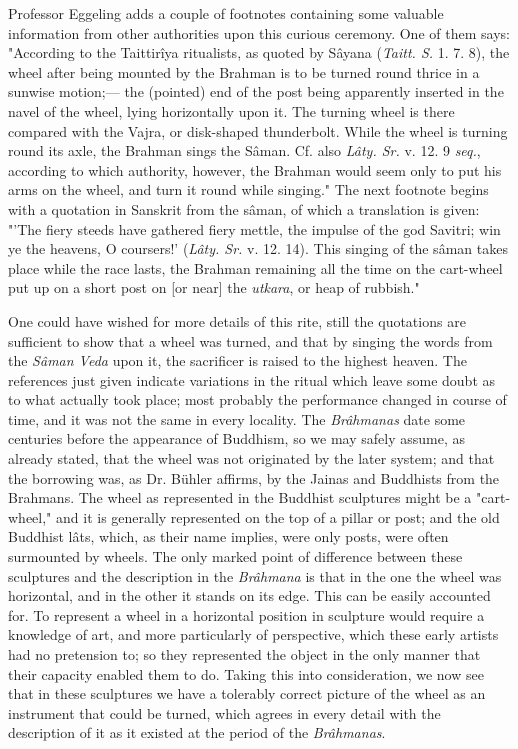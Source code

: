 \documentclass[a4paper, 11pt, oneside, polutonikogreek, english]{article}
\begin{document}
Professor Eggeling adds a couple of footnotes containing some valuable information from other authorities upon this curious ceremony. One of them says: "According to the Taittirîya ritualists, as quoted by Sâyana (\emph{Taitt. S.} 1. 7. 8), the wheel after being mounted by the Brahman is to be turned round thrice in a sunwise motion;--- the (pointed) end of the post being apparently inserted in the navel of the wheel, lying horizontally upon it. The turning wheel is there compared with the Vajra, or disk-shaped thunderbolt. While the wheel is turning round its axle, the Brahman sings the Sâman. Cf. also \emph{Lâty. Sr.} v. 12. 9 \emph{seq.}, according to which authority, however, the Brahman would seem only to put his arms on the wheel, and turn it round while singing." The next footnote begins with a quotation in Sanskrit from the sâman, of which a translation is given: "'The fiery steeds have gathered fiery mettle, the impulse of the god Savitri; win ye the heavens, O coursers!' (\emph{Lâty. Sr.} v. 12. 14). This singing of the sâman takes place while the race lasts, the Brahman remaining all the time on the cart-wheel put up on a short post on [or near] the \emph{utkara}, or heap of rubbish."

One could have wished for more details of this rite, still the quotations are sufficient to show that a wheel was turned, and that by singing the words from the \emph{Sâman Veda} upon it, the sacrificer is raised to the highest heaven. The references just given indicate variations in the ritual which leave some doubt as to what actually took place; most probably the performance changed in course of time, and it was not the same in every locality. The \emph{Brâhmanas} date some centuries before the appearance of Buddhism, so we may safely assume, as already stated, that the wheel was not originated by the later system; and that the borrowing was, as Dr. Bühler affirms, by the Jainas and Buddhists from the Brahmans. The wheel as represented in the Buddhist sculptures might be a "cart-wheel," and it is generally represented on the top of a pillar or post; and the old Buddhist lâts, which, as their name implies, were only posts, were often surmounted by wheels. The only marked point of difference between these sculptures and the description in the \emph{Brâhmana} is that in the one the wheel was horizontal, and in the other it stands on its edge. This can be easily accounted for. To represent a wheel in a horizontal position in sculpture would require a knowledge of art, and more particularly of perspective, which these early artists had no pretension to; so they represented the object in the only manner that their capacity enabled them to do. Taking this into consideration, we now see that in these sculptures we have a tolerably correct picture of the wheel as an instrument that could be turned, which agrees in every detail with the description of it as it existed at the period of the \emph{Brâhmanas}.
\end{document}
